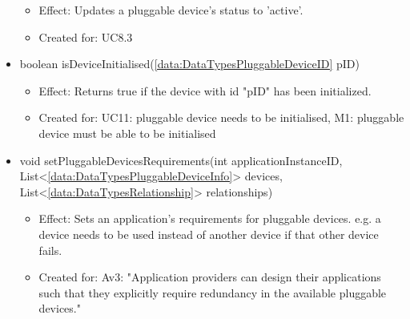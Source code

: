 \begin{description}
\begin{itemize}[noitemsep,nolistsep,leftmargin=-.25cm]
\begin{itemize}[noitemsep,nolistsep]
           \item Effect: Updates a pluggable device's status to 'active'.
\item Created for: UC8.3
        \end{itemize}
      \item \textsf{boolean isDeviceInitialised(\ref{data:DataTypesPluggableDeviceID} pID)}
        \begin{itemize}[noitemsep,nolistsep]
           \item Effect: Returns true if the device with id "pID" has been initialized.
\item Created for: UC11: pluggable device needs to be initialised, M1: pluggable device must be able to be initialised
        \end{itemize}
      \item \textsf{void setPluggableDevicesRequirements(int applicationInstanceID, List\textless{}\ref{data:DataTypesPluggableDeviceInfo}\textgreater{} devices, List\textless{}\ref{data:DataTypesRelationship}\textgreater{} relationships)}
        \begin{itemize}[noitemsep,nolistsep]
           \item Effect: Sets an application's requirements for pluggable devices. e.g. a device needs to be used instead of another device if that other device fails.
\item Created for: Av3: "Application providers can design their applications such that they explicitly require redundancy in the available pluggable devices."
        \end{itemize}
    \end{itemize}
    \end{description}

